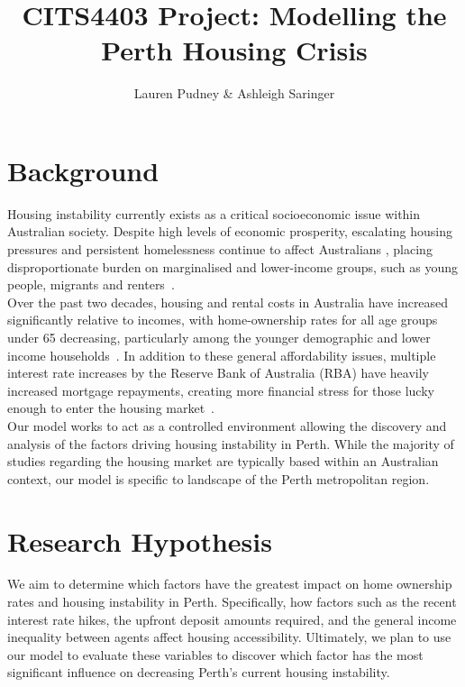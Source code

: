 \documentclass[11pt]{article}
\begin{document}
\title{CITS4403 Project: Modelling the Perth Housing Crisis}
\author{Lauren Pudney \& Ashleigh Saringer}

\maketitle

\section{Background}
\label{sec:introduction}
Housing instability currently exists as a critical socioeconomic issue within 
Australian society. Despite high levels of economic prosperity, escalating housing
pressures and persistent homelessness continue to affect Australians
\cite{absEstimating, aihw2023australia}, placing disproportionate 
burden on marginalised and lower-income groups, such as
young people, migrants and renters~\cite{daley2018housing}. 
\\
Over the past two decades, housing and rental costs in Australia have increased
significantly relative to incomes, with home-ownership rates for all age
groups under 65 decreasing, particularly among the younger demographic and lower 
income households~\cite{daley2018housing}. In addition to these general affordability issues,
multiple interest rate increases by the Reserve Bank of Australia (RBA) have 
heavily increased mortgage repayments, creating more financial stress for those lucky enough
to enter the housing market~\cite{commbank2026rba}. 
\\
Our model works to act as a controlled environment allowing the discovery and analysis of the
factors driving housing instability in Perth. While the majority of studies regarding the housing market
are typically based within an Australian context, our model is specific to landscape of the Perth
metropolitan region.

\section{Research Hypothesis}
We aim to determine which factors have the greatest
impact on home ownership rates and housing instability in Perth. Specifically, 
how factors such as the recent interest rate hikes, the upfront deposit amounts 
required, and the general income inequality between agents affect housing 
accessibility. Ultimately, we plan to use our model to evaluate these variables
to discover which factor has the most significant influence on decreasing Perth's 
current housing instability. %
\end{document}
